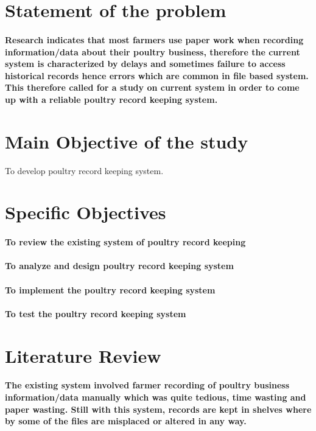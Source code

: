 \documentclass[10pt,a4paper]{article}
\begin{document}
\section{Statement of the problem}
\paragraph{Research indicates that most farmers use paper work when recording information/data about their poultry business, therefore the current system is characterized by delays and sometimes failure to access historical records hence errors which are common in file based system. This therefore called for a study on current system in order to come up with a reliable poultry record keeping system.}

\section{Main Objective of the study}
To develop poultry record keeping system.

\section{Specific Objectives}
\paragraph{To review the existing system of poultry record keeping} 
\paragraph{To analyze and design poultry record keeping system}
\paragraph{To implement the poultry record keeping system} 
\paragraph{To test the poultry record keeping system}

\section{Literature Review}
\paragraph{The existing system involved farmer recording of  poultry business information/data manually which was quite tedious, time wasting and paper wasting. Still with this system, records are kept in shelves where by some of the files are misplaced or altered in any way.}
\end{document}
